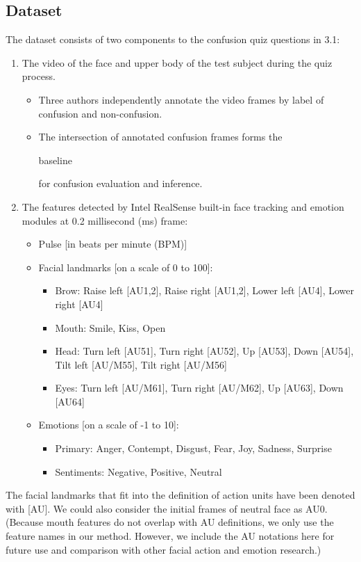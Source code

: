 \documentclass[12pt,letterpaper]{article}
\begin{document}
\subsection{Dataset}

The dataset consists of two components to the confusion quiz questions in 3.1: 
\begin{enumerate}
\item The video of the face and upper body of the test subject during the quiz process.
\begin{itemize}
\item Three authors independently annotate the video frames by label of confusion and non-confusion. 
\item The intersection of annotated confusion frames forms the \begin{bf}baseline\end{bf} for confusion evaluation and inference.
\end{itemize}

\item The features detected by Intel RealSense built-in face tracking and emotion modules at 0.2 millisecond (ms) frame:
\begin{itemize}
\item Pulse [in beats per minute (BPM)]
\item Facial landmarks [on a scale of 0 to 100]: 
\begin{itemize}
\item Brow: Raise left [AU1,2], Raise right [AU1,2], Lower left [AU4], Lower right [AU4]
\item Mouth: Smile, Kiss, Open
\item Head: Turn left [AU51], Turn right [AU52], Up [AU53], Down [AU54], Tilt left [AU/M55], Tilt right [AU/M56]
\item Eyes: Turn left [AU/M61], Turn right [AU/M62], Up [AU63], Down [AU64]
\end{itemize}

\item Emotions [on a scale of -1 to 10]: 
\begin{itemize}
\item Primary: Anger, Contempt, Disgust, Fear, Joy, Sadness, Surprise
\item Sentiments: Negative, Positive, Neutral
\end{itemize}
\end{itemize}
\end{enumerate}

The facial landmarks that fit into the definition of action units have been denoted with [AU]. We could also consider the initial frames of neutral face as AU0. (Because mouth features do not overlap with AU definitions, we only use the feature names in our method. However, we include the AU notations here for future use and comparison with other facial action and emotion research.)
\end{document}
